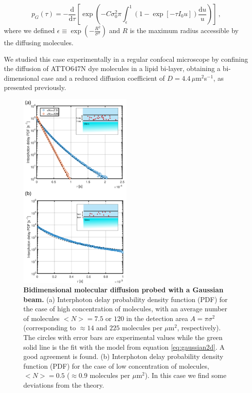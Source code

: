 \begin{equation}
p_{G}(\tau)=-\frac{\mbox{d}}{\mbox{d}\tau}\left[ \exp\left(-C \sigma_0^2 \pi \int_{\epsilon}^1\left(1-\exp\left[-\tau I_0 u \right]\right) \frac{\mbox{d}u}{u}\right)    \right]\,,  
\label{eq:gaussian2d}
\end{equation}
where we defined $\epsilon \equiv \exp\left(-\frac{R^2}{\sigma^2}\right)$ and $R$ is the maximum radius accessible by the diffusing molecules.

We studied this case experimentally in a regular confocal microscope by confining the diffusion of ATTO647N dye molecules in a lipid bi-layer, obtaining a bi-dimensional case and a reduced diffusion coefficient of $D=4.4\, \mu$m$^2$s$^{-1}$, as presented previously. \cite{Pradhan2016} 

\begin{figure}
\centering
\includegraphics[width=0.5\textwidth]{2D_gaussian_with_single}%
\caption{\textbf{Bidimensional molecular diffusion probed with a Gaussian beam.} (a) Interphoton delay probability density function (PDF) for the case of high concentration of molecules, with an average
number of molecules $<N>=7.5$ or $120$ in the detection area $A=\pi\sigma^2$ 
(corresponding to $\approx 14$ and $225$ molecules per $\mu$m$^2$, respectively). 
The circles with error bars are experimental values while the green solid line is 
the fit with the model from equation \ref{eq:gaussian2d}. A good agreement is found. 
(b) Interphoton delay probability density function (PDF) for the case of low concentration
of molecules, $<N>=0.5$ ($\approx 0.9$ molecules per $\mu$m$^2$). In this case we find some deviations
from the theory. 
\label{fg:gaussian2d}}
\end{figure}

